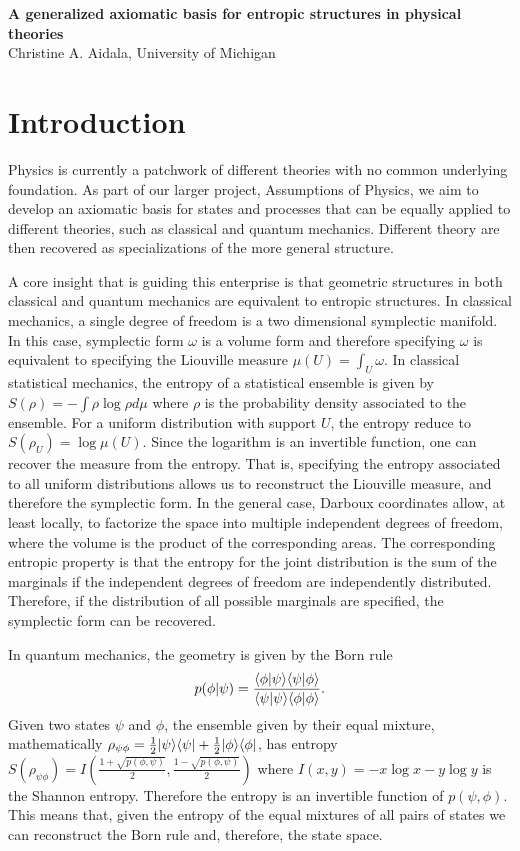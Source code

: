 \begin{center}
	\textbf{A generalized axiomatic basis for entropic structures in physical theories} \\
	Christine A. Aidala, University of Michigan
\end{center}

\section{Introduction}

Physics is currently a patchwork of different theories with no common underlying foundation. As part of our larger project, Assumptions of Physics, we aim to develop an axiomatic basis for states and processes that can be equally applied to different theories, such as classical and quantum mechanics. Different theory are then recovered as specializations of the more general structure.

A core insight that is guiding this enterprise is that geometric structures in both classical and quantum mechanics are equivalent to entropic structures. In classical mechanics, a single degree of freedom is a two dimensional symplectic manifold. In this case, symplectic form $\omega$ is a volume form and therefore specifying $\omega$ is equivalent to specifying the Liouville measure $\mu(U) = \int_U \omega$. In classical statistical mechanics, the entropy of a statistical ensemble is given by $S(\rho) = - \int \rho \log \rho d\mu$ where $\rho$ is the probability density associated to the ensemble. For a uniform distribution with support $U$, the entropy reduce to $S(\rho_U) = \log \mu(U)$. Since the logarithm is an invertible function, one can recover the measure from the entropy. That is, specifying the entropy associated to all uniform distributions allows us to reconstruct the Liouville measure, and therefore the symplectic form. In the general case, Darboux coordinates allow, at least locally, to factorize the space into multiple independent degrees of freedom, where the volume is the product of the corresponding areas. The corresponding entropic property is that the entropy for the joint distribution is the sum of the marginals if the independent degrees of freedom are independently distributed. Therefore, if the distribution of all possible marginals are specified, the symplectic form can be recovered.

In quantum mechanics, the geometry is given by the Born rule
\begin{equation}
	p(\phi|\psi) = \frac{\langle \phi | \psi \rangle\langle \psi | \phi \rangle}{\langle \psi | \psi \rangle\langle \phi | \phi \rangle}.
\end{equation}
Given two states $\psi$ and $\phi$, the ensemble given by their equal mixture, mathematically $\rho_{\psi\phi} = \frac{1}{2}|\psi\rangle\langle\psi|+\frac{1}{2}|\phi\rangle\langle\phi|$,  has entropy $S(\rho_{\psi\phi}) = I\left(\frac{1 + \sqrt{p(\phi,\psi)}}{2},\frac{1 - \sqrt{p(\phi,\psi)}}{2} \right)$ where $I(x,y) = -x \log x -y \log y$ is the Shannon entropy. Therefore the entropy is an invertible function of $p(\psi,\phi)$. This means that, given the entropy of the equal mixtures of all pairs of states we can reconstruct the Born rule and, therefore, the state space.

